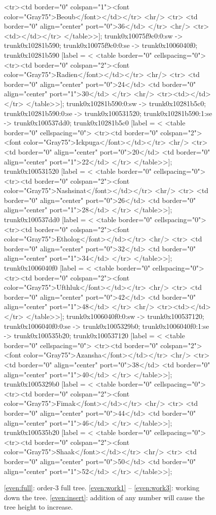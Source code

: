 \documentclass[12pt]{article}
\begin{document}
\begin{figure}
{{	<tr><td border="0" colspan="1"><font color="Gray75">Beoub</font></td></tr>
	<hr/>
	<tr>
	<td border="0" align="center" port="0">36</td>
	</tr>
	<hr/>
	<tr><td></td></tr>
</table>>];
	trunk0x10075f9c0:0:sw -> trunk0x10281b590;
	trunk0x10075f9c0:0:se -> trunk0x1006040f0;
	trunk0x10281b590 [label = <
<table border="0" cellspacing="0">
	<tr><td border="0" colspan="2"><font color="Gray75">Radien</font></td></tr>
	<hr/>
	<tr>
	<td border="0" align="center" port="0">24</td>
	<td border="0" align="center" port="1">30</td>
	</tr>
	<hr/>
	<tr><td></td></tr>
</table>>];
	trunk0x10281b590:0:sw -> trunk0x10281b5c0;
	trunk0x10281b590:0:se -> trunk0x100531520;
	trunk0x10281b590:1:se -> trunk0x100537dd0;
	trunk0x10281b5c0 [label = <
<table border="0" cellspacing="0">
	<tr><td border="0" colspan="2"><font color="Gray75">Ickpuga</font></td></tr>
	<hr/>
	<tr>
	<td border="0" align="center" port="0">20</td>
	<td border="0" align="center" port="1">22</td>
	</tr>
</table>>];
	trunk0x100531520 [label = <
<table border="0" cellspacing="0">
	<tr><td border="0" colspan="2"><font color="Gray75">Nashsinat</font></td></tr>
	<hr/>
	<tr>
	<td border="0" align="center" port="0">26</td>
	<td border="0" align="center" port="1">28</td>
	</tr>
</table>>];
	trunk0x100537dd0 [label = <
<table border="0" cellspacing="0">
	<tr><td border="0" colspan="2"><font color="Gray75">Etholog</font></td></tr>
	<hr/>
	<tr>
	<td border="0" align="center" port="0">32</td>
	<td border="0" align="center" port="1">34</td>
	</tr>
</table>>];
	trunk0x1006040f0 [label = <
<table border="0" cellspacing="0">
	<tr><td border="0" colspan="2"><font color="Gray75">Ufthluk</font></td></tr>
	<hr/>
	<tr>
	<td border="0" align="center" port="0">42</td>
	<td border="0" align="center" port="1">48</td>
	</tr>
	<hr/>
	<tr><td></td></tr>
</table>>];
	trunk0x1006040f0:0:sw -> trunk0x100537120;
	trunk0x1006040f0:0:se -> trunk0x1005329b0;
	trunk0x1006040f0:1:se -> trunk0x100535b20;
	trunk0x100537120 [label = <
<table border="0" cellspacing="0">
	<tr><td border="0" colspan="2"><font color="Gray75">Azansha</font></td></tr>
	<hr/>
	<tr>
	<td border="0" align="center" port="0">38</td>
	<td border="0" align="center" port="1">40</td>
	</tr>
</table>>];
	trunk0x1005329b0 [label = <
<table border="0" cellspacing="0">
	<tr><td border="0" colspan="2"><font color="Gray75">Fimak</font></td></tr>
	<hr/>
	<tr>
	<td border="0" align="center" port="0">44</td>
	<td border="0" align="center" port="1">46</td>
	</tr>
</table>>];
	trunk0x100535b20 [label = <
<table border="0" cellspacing="0">
	<tr><td border="0" colspan="2"><font color="Gray75">Shaak</font></td></tr>
	<hr/>
	<tr>
	<td border="0" align="center" port="0">50</td>
	<td border="0" align="center" port="1">52</td>
	</tr>
</table>>];
		}
	}
    \caption{\ref{even:full}: order-3 full tree. \ref{even:work1} -- \ref{even:work3}: working down the tree. \ref{even:insert}: addition of any number will cause the tree height to increase.}%
	\label{even}%
\end{figure}%
\end{document}
